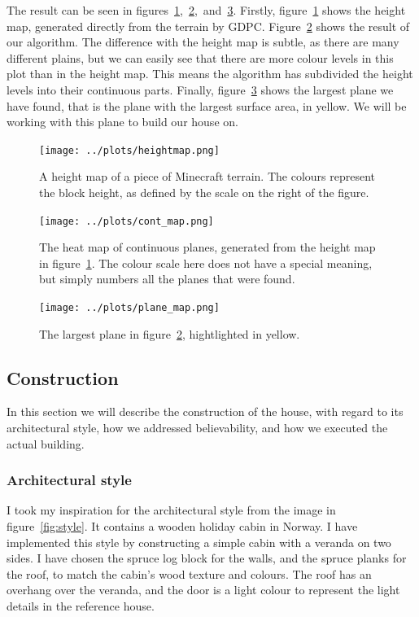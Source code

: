 \documentclass[10pt]{article}
\begin{document}
The result can be seen in figures~\ref{fig:heightmap},~\ref{fig:cont_map},~and~\ref{fig:plane_map}. Firstly, figure~\ref{fig:heightmap} shows the height map, generated directly from the terrain by GDPC. Figure~\ref{fig:cont_map} shows the result of our algorithm. The difference with the height map is subtle, as there are many different plains, but we can easily see that there are more colour levels in this plot than in the height map. This means the algorithm has subdivided the height levels into their continuous parts. Finally, figure~\ref{fig:plane_map} shows the largest plane we have found, that is the plane with the largest surface area, in yellow. We will be working with this plane to build our house on.

\begin{figure}
    \texttt{[image: ../plots/heightmap.png]}
    \centering
    \caption{A height map of a piece of Minecraft terrain. The colours represent the block height, as defined by the scale on the right of the figure.}
    \label{fig:heightmap}
\end{figure}
\begin{figure}
    \texttt{[image: ../plots/cont\_map.png]}
    \centering
    \caption{The heat map of continuous planes, generated from the height map in figure~\ref{fig:heightmap}. The colour scale here does not have a special meaning, but simply numbers all the planes that were found.}
    \label{fig:cont_map}
\end{figure}
\begin{figure}
    \texttt{[image: ../plots/plane\_map.png]}
    \centering
    \caption{The largest plane in figure~\ref{fig:cont_map}, hightlighted in yellow.}
    \label{fig:plane_map}
\end{figure}

\subsection{Construction}
In this section we will describe the construction of the house, with regard to its architectural style, how we addressed believability, and how we executed the actual building.
\subsubsection{Architectural style}

I took my inspiration for the architectural style from the image in figure~\ref{fig:style}. It contains a wooden holiday cabin in Norway. I have implemented this style by constructing a simple cabin with a veranda on two sides. I have chosen the spruce log block for the walls, and the spruce planks for the roof, to match the cabin's wood texture and colours. The roof has an overhang over the veranda, and the door is a light colour to represent the light details in the reference house. %
\end{document}
